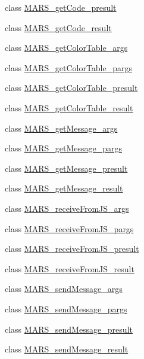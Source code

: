 \begin{DoxyCompactItemize}
\item 
class \hyperlink{classMARS_1_1MARS__getCode__presult}{M\+A\+R\+S\+\_\+get\+Code\+\_\+presult}
\item 
class \hyperlink{classMARS_1_1MARS__getCode__result}{M\+A\+R\+S\+\_\+get\+Code\+\_\+result}
\item 
class \hyperlink{classMARS_1_1MARS__getColorTable__args}{M\+A\+R\+S\+\_\+get\+Color\+Table\+\_\+args}
\item 
class \hyperlink{classMARS_1_1MARS__getColorTable__pargs}{M\+A\+R\+S\+\_\+get\+Color\+Table\+\_\+pargs}
\item 
class \hyperlink{classMARS_1_1MARS__getColorTable__presult}{M\+A\+R\+S\+\_\+get\+Color\+Table\+\_\+presult}
\item 
class \hyperlink{classMARS_1_1MARS__getColorTable__result}{M\+A\+R\+S\+\_\+get\+Color\+Table\+\_\+result}
\item 
class \hyperlink{classMARS_1_1MARS__getMessage__args}{M\+A\+R\+S\+\_\+get\+Message\+\_\+args}
\item 
class \hyperlink{classMARS_1_1MARS__getMessage__pargs}{M\+A\+R\+S\+\_\+get\+Message\+\_\+pargs}
\item 
class \hyperlink{classMARS_1_1MARS__getMessage__presult}{M\+A\+R\+S\+\_\+get\+Message\+\_\+presult}
\item 
class \hyperlink{classMARS_1_1MARS__getMessage__result}{M\+A\+R\+S\+\_\+get\+Message\+\_\+result}
\item 
class \hyperlink{classMARS_1_1MARS__receiveFromJS__args}{M\+A\+R\+S\+\_\+receive\+From\+J\+S\+\_\+args}
\item 
class \hyperlink{classMARS_1_1MARS__receiveFromJS__pargs}{M\+A\+R\+S\+\_\+receive\+From\+J\+S\+\_\+pargs}
\item 
class \hyperlink{classMARS_1_1MARS__receiveFromJS__presult}{M\+A\+R\+S\+\_\+receive\+From\+J\+S\+\_\+presult}
\item 
class \hyperlink{classMARS_1_1MARS__receiveFromJS__result}{M\+A\+R\+S\+\_\+receive\+From\+J\+S\+\_\+result}
\item 
class \hyperlink{classMARS_1_1MARS__sendMessage__args}{M\+A\+R\+S\+\_\+send\+Message\+\_\+args}
\item 
class \hyperlink{classMARS_1_1MARS__sendMessage__pargs}{M\+A\+R\+S\+\_\+send\+Message\+\_\+pargs}
\item 
class \hyperlink{classMARS_1_1MARS__sendMessage__presult}{M\+A\+R\+S\+\_\+send\+Message\+\_\+presult}
\item 
class \hyperlink{classMARS_1_1MARS__sendMessage__result}{M\+A\+R\+S\+\_\+send\+Message\+\_\+result}

\end{DoxyCompactItemize}
